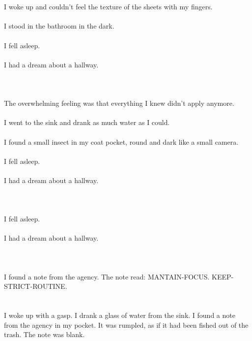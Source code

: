 \documentclass{article}
\begin{document}
    \section{}
    I woke up and couldn't feel the texture of the sheets with my fingers.\\\\I stood in the bathroom in the dark.\\\\I fell asleep.\\\\I had a dream about a hallway.\\\\ 
    \newpage
    
    \section{}
    The overwhelming feeling was that everything I knew didn't apply anymore.\\\\I went to the sink and drank as much water as I could.\\\\I found a small insect in my coat pocket, round and dark like a small camera.\\\\I fell asleep.\\\\I had a dream about a hallway.\\\\ 
    \newpage
    
    \section{}
    I fell asleep.\\\\I had a dream about a hallway.\\\\ 
    \newpage
    
    \section{}
    I found a note from the agency. The note read: MANTAIN-FOCUS. KEEP-STRICT-ROUTINE.  
    \newpage
    
    \section{}
    I woke up with a gasp. I drank a glass of water from the sink. I found a note from the agency in my pocket. It was rumpled, as if it had been fished out of the trash. The note was blank.  
    \newpage
    
\end{document}
